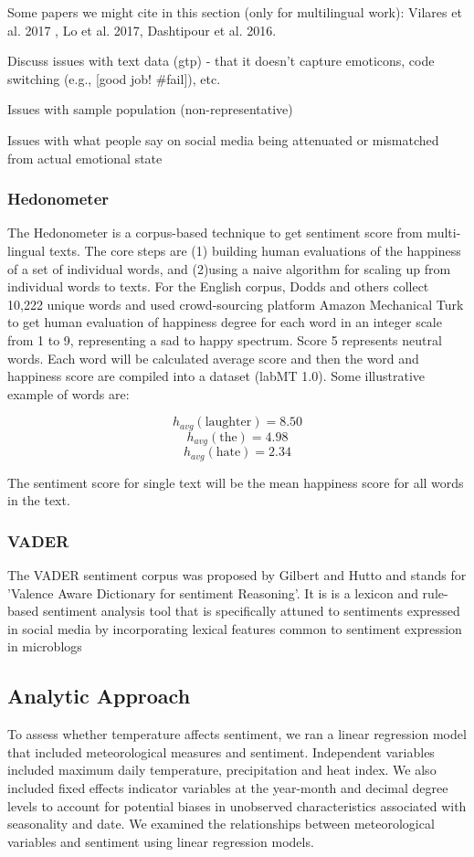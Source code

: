 \documentclass{article}
\begin{document}
Some papers we might cite in this section (only for multilingual work): Vilares et al. 2017 , Lo et al. 2017, Dashtipour et al. 2016.

Discuss issues with text data (gtp) - that it doesn’t capture emoticons, code switching (e.g., [good job! \#fail]), etc.

Issues with sample population (non-representative)

Issues with what people say on social media being attenuated or mismatched from actual emotional state

\subsubsection{Hedonometer}
The Hedonometer \cite{dodds_temporal_2011} is a corpus-based technique to get sentiment score from multi-lingual texts. The core steps are (1) building human evaluations of the happiness of a set of individual words, and (2)using a naive algorithm for scaling up from individual words to texts. For the English corpus, Dodds and others \cite{dodds_temporal_2011} collect 10,222 unique words and used crowd-sourcing platform Amazon Mechanical Turk to get human evaluation of happiness degree for each word in an integer scale from 1 to 9, representing a sad to happy spectrum. Score 5 represents neutral words. Each word will be calculated average score and then the word and happiness score are compiled into a dataset (labMT 1.0). Some illustrative example of words are: 

\[h_{avg} (\text{laughter}) = 8.50 \]
\[h_{avg} (\text{the}) = 4.98\]
\[h_{avg} (\text{hate}) = 2.34\]

The sentiment score for single text will be the mean happiness score for all words in the text.


\subsubsection{VADER}
The VADER sentiment corpus was proposed by Gilbert and Hutto \cite{gilbert_vader_2014} and stands for 'Valence Aware Dictionary for sentiment Reasoning'. It is is a lexicon and rule-based sentiment analysis tool that is specifically attuned to sentiments expressed in social media by incorporating lexical features common to sentiment expression in microblogs

\subsection{Analytic Approach}
To assess whether temperature affects sentiment, we ran a linear regression model that included meteorological measures and sentiment. Independent variables included maximum daily temperature, precipitation and heat index. We also included fixed effects indicator variables at the year-month and decimal degree levels to account for potential biases in unobserved characteristics associated with seasonality and date. We examined the relationships between meteorological variables and sentiment using linear regression models.
\end{document}
